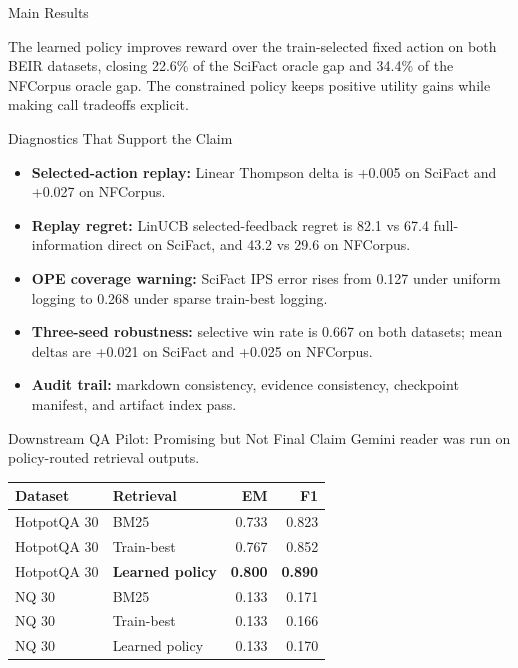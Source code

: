 \documentclass[final,20pt]{beamer}
\newlength{\colwidth}
\begin{document}
\begin{frame}[t]
\begin{columns}[t]
\begin{column}{\colwidth}
\begin{block}{Main Results}
    \vspace{0.35em}
    

    The learned policy improves reward over the train-selected fixed action on both BEIR datasets, closing 22.6\% of the SciFact oracle gap and 34.4\% of the NFCorpus oracle gap. The constrained policy keeps positive utility gains while making call tradeoffs explicit.
  \end{block}

  \begin{block}{Diagnostics That Support the Claim}
    \begin{itemize}
      \item \textbf{Selected-action replay:} Linear Thompson delta is +0.005 on SciFact and +0.027 on NFCorpus.
      \item \textbf{Replay regret:} LinUCB selected-feedback regret is 82.1 vs 67.4 full-information direct on SciFact, and 43.2 vs 29.6 on NFCorpus.
      \item \textbf{OPE coverage warning:} SciFact IPS error rises from 0.127 under uniform logging to 0.268 under sparse train-best logging.
      \item \textbf{Three-seed robustness:} selective win rate is 0.667 on both datasets; mean deltas are +0.021 on SciFact and +0.025 on NFCorpus.
      \item \textbf{Audit trail:} markdown consistency, evidence consistency, checkpoint manifest, and artifact index pass.
    \end{itemize}
  \end{block}

  \begin{exampleblock}{Downstream QA Pilot: Promising but Not Final Claim}
    \small
    Gemini reader was run on policy-routed retrieval outputs.

    \begin{table}
      \centering
      \begin{tabular}{l l r r}
        \toprule
        \textbf{Dataset} & \textbf{Retrieval} & \textbf{EM} & \textbf{F1} \\
        \midrule
        HotpotQA 30 & BM25 & 0.733 & 0.823 \\
        HotpotQA 30 & Train-best & 0.767 & 0.852 \\
        HotpotQA 30 & \textbf{Learned policy} & \textbf{0.800} & \textbf{0.890} \\
        \midrule
        NQ 30 & BM25 & 0.133 & 0.171 \\
        NQ 30 & Train-best & 0.133 & 0.166 \\
        NQ 30 & Learned policy & 0.133 & 0.170 \\
        \bottomrule
      \end{tabular}
    \end{table}


\end{exampleblock}
\end{column}
\end{columns}
\end{frame}
\end{document}
